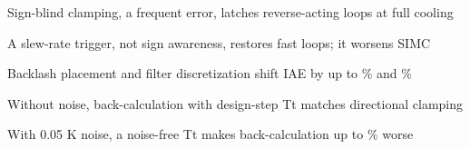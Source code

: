 \begin{highlights}
\item Sign-blind clamping, a frequent error, latches reverse-acting loops at full cooling
\item A slew-rate trigger, not sign awareness, restores fast loops; it worsens SIMC
\item Backlash placement and filter discretization shift IAE by up to \vorderTwodIAE\% and \vorderFourdIAE\%
\item Without noise, back-calculation with design-step Tt matches directional clamping
\item With 0.05 K noise, a noise-free Tt makes back-calculation up to \vnzbchimaxpct\% worse
\end{highlights}
